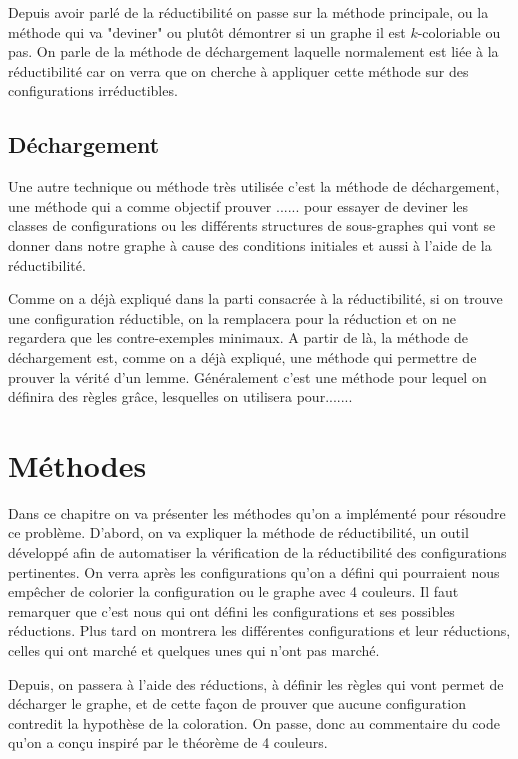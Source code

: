 \documentclass[10pt,a4paper]{article}
\begin{document}
Depuis avoir parlé de la réductibilité on passe sur la méthode principale, ou la méthode qui va "deviner" ou plutôt démontrer si un graphe il est $k$-coloriable ou pas. On parle de la méthode de déchargement laquelle normalement est liée à la réductibilité car on verra que on cherche à appliquer cette méthode sur des configurations irréductibles.



\subsection{Déchargement}

Une autre technique ou méthode très utilisée c'est la méthode de déchargement, une méthode qui a comme objectif prouver ...... pour essayer de deviner les classes de configurations ou les différents structures de sous-graphes qui vont se donner dans notre graphe à cause des conditions initiales et aussi à l'aide de la réductibilité. 

Comme on a déjà expliqué dans la parti consacrée à la réductibilité, si on trouve une configuration réductible, on la remplacera pour la réduction et on ne regardera que les contre-exemples minimaux. A partir de là, la méthode de déchargement est, comme on a déjà expliqué, une méthode qui permettre de prouver la vérité d'un lemme. Généralement c'est une méthode pour lequel on définira des règles grâce, lesquelles on utilisera pour.......




\section{Méthodes}
\label{chap:meth}

Dans ce chapitre on va présenter les méthodes qu'on a implémenté pour résoudre ce problème. D'abord, on va expliquer la méthode de réductibilité, un outil développé afin de automatiser la vérification de la réductibilité des configurations pertinentes. On verra après les configurations qu'on a défini qui pourraient nous empêcher de colorier la configuration ou le graphe avec 4 couleurs. Il faut remarquer que c'est nous qui ont défini les configurations et ses possibles réductions. Plus tard on montrera les différentes configurations et leur réductions, celles qui ont marché et quelques unes qui n'ont pas marché. 

Depuis, on passera à l'aide des réductions, à définir les règles qui vont permet de décharger le graphe, et de cette façon de prouver que aucune configuration contredit la hypothèse de la coloration. On passe, donc au commentaire du code qu'on a conçu inspiré par le théorème de 4 couleurs.
\end{document}
